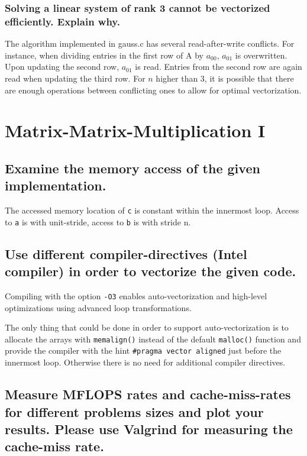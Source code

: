 \documentclass[11pt]{article}
\begin{document}
\subsubsection*{Solving a linear system of rank 3 cannot be vectorized efficiently. Explain why.}
The algorithm implemented in gauss.c has several read-after-write conflicts. For instance, when dividing entries in the first row of A by $a_{00}$, $a_{01}$ is overwritten. Upon updating the second row, $a_{01}$ is read. Entries from the second row are again read when updating the third row. For $n$ higher than 3, it is possible that there are enough operations between conflicting ones to allow for optimal vectorization.
\section{Matrix-Matrix-Multiplication I}

\subsection*{Examine the memory access of the given implementation.}

The accessed memory location of \texttt{c} is constant within the innermost loop. Access to \texttt{a} is with unit-stride, access to \texttt{b} is with stride n.

\subsection*{Use different compiler-directives (Intel compiler) in order to vectorize the given code.}

Compiling with the option \texttt{-O3} enables auto-vectorization and high-level optimizations using advanced loop transformations.

The only thing that could be done in order to support auto-vectorization is to allocate the arrays with \texttt{memalign()} instead of the default \texttt{malloc()} function and provide the compiler with the hint \texttt{\#pragma vector aligned} just before the innermost loop. Otherwise there is no need for additional compiler directives.

\subsection*{Measure MFLOPS rates and cache-miss-rates for different problems sizes and plot your results. Please use Valgrind for measuring the cache-miss rate.}
\end{document}
